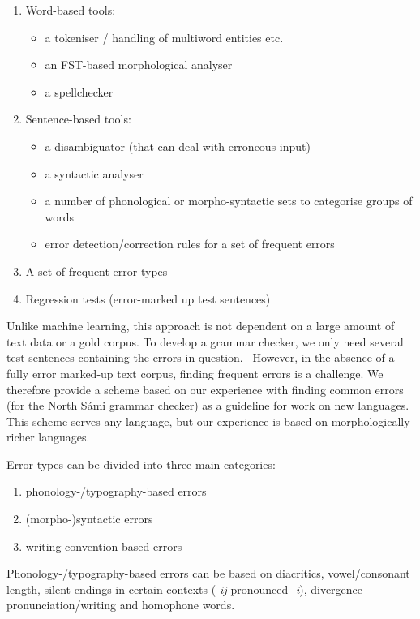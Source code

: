 \documentclass[free]{flammie}
\newcommand{\compresslist}{
\setlength{\itemsep}{1pt}
\setlength{\parskip}{0pt}
\setlength{\parsep}{0pt}
}
\begin{document}
{\compresslist{}
\begin{enumerate}
    \item Word-based tools:
    \begin{itemize}
        \item a tokeniser / handling of multiword entities etc.
        \item an FST-based morphological analyser
        \item a spellchecker
\end{itemize}
    \item Sentence-based tools:
    \begin{itemize}
        \item a disambiguator (that can deal with erroneous input)
        \item a syntactic analyser
        \item a number of phonological or morpho-syntactic sets to categorise
            groups of words
        \item error detection/correction rules for a set of frequent errors
    \end{itemize}
    \item A set of frequent error types
    \item Regression tests (error-marked up test sentences)
\end{enumerate}
}



Unlike machine learning, this approach is not dependent on a large amount of
text data or a gold corpus. To develop a grammar checker, we only need several
test sentences containing the errors in
question.~\cite{wiechetek-etal-2021-fumbling} However, in the absence of a fully
error marked-up text corpus, finding frequent errors is a challenge.  We
therefore provide a scheme based on our experience with finding common errors
(for the North Sámi grammar checker) as a guideline for work on new languages.
This scheme serves any language, but our experience is based on morphologically
richer languages.

Error types can be divided into three main categories:
{\compresslist{}
\begin{enumerate}
    \item phonology-/typography-based errors
    \item (morpho-)syntactic errors
    \item writing convention-based errors
\end{enumerate}
}

Phonology-/typography-based errors can be based on diacritics, vowel/consonant
length, silent endings in certain contexts (\textit{-ij} pronounced
\textit{-i}), divergence pronunciation/writing and homophone words.
\end{document}
